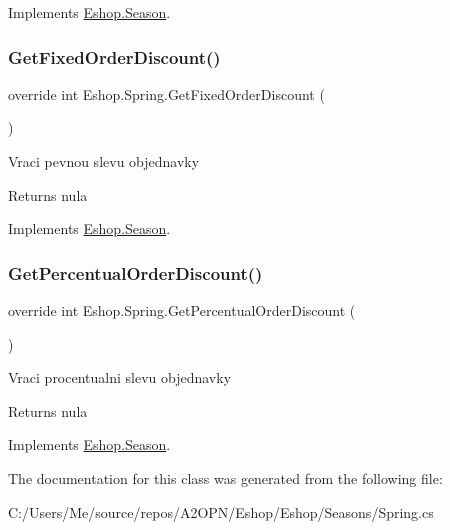 Implements \mbox{\hyperlink{class_eshop_1_1_season}{Eshop.\+Season}}.

\mbox{\label{class_eshop_1_1_spring_aa3dfae255c5d19147350cd78fa140f55}} 
\subsubsection{\texorpdfstring{GetFixedOrderDiscount()}{GetFixedOrderDiscount()}}
{\footnotesize\ttfamily override int Eshop.\+Spring.\+Get\+Fixed\+Order\+Discount (\begin{DoxyParamCaption}{ }\end{DoxyParamCaption})\hspace{0.3cm}{\ttfamily [virtual]}}



Vraci pevnou slevu objednavky 

\begin{DoxyReturn}{Returns}
nula
\end{DoxyReturn}


Implements \mbox{\hyperlink{class_eshop_1_1_season}{Eshop.\+Season}}.

\mbox{\label{class_eshop_1_1_spring_a1c4c4c98856a009b527eb0c74af83297}} 
\subsubsection{\texorpdfstring{GetPercentualOrderDiscount()}{GetPercentualOrderDiscount()}}
{\footnotesize\ttfamily override int Eshop.\+Spring.\+Get\+Percentual\+Order\+Discount (\begin{DoxyParamCaption}{ }\end{DoxyParamCaption})\hspace{0.3cm}{\ttfamily [virtual]}}



Vraci procentualni slevu objednavky 

\begin{DoxyReturn}{Returns}
nula
\end{DoxyReturn}


Implements \mbox{\hyperlink{class_eshop_1_1_season}{Eshop.\+Season}}.



The documentation for this class was generated from the following file\+:\begin{DoxyCompactItemize}
\item 
C\+:/\+Users/\+Me/source/repos/\+A2\+O\+P\+N/\+Eshop/\+Eshop/\+Seasons/Spring.\+cs\end{DoxyCompactItemize}
